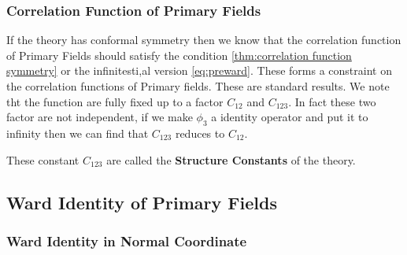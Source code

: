 \subsubsection{Correlation Function of Primary Fields}

If the theory has conformal symmetry then we know that the correlation function of Primary Fields should satisfy the condition \cref{thm:correlation function symmetry} or the infinitesti,al version \cref{eq:preward}. These forms a constraint on the correlation functions of Primary fields. 
These are standard results. We note tht the function are fully fixed up to a factor $ C_{12} $ and $ C_{123} $. In fact these two factor are not independent, if we make $ \phi_3 $ a identity operator and put it to infinity then we can find that $ C_{123} $ reduces to $ C_{12} $.

These constant $ C_{123} $ are called the \textbf{Structure Constants} of the theory.

\subsection{Ward Identity of Primary Fields}

\subsubsection{Ward Identity in Normal Coordinate}

